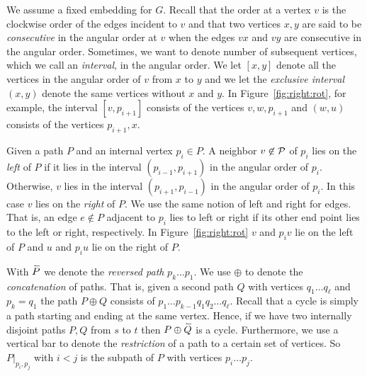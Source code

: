     We assume a fixed embedding for $G$. Recall that the order at a vertex $v$ is the clockwise order of the edges incident to $v$ and that two vertices $x, y$ are said to be \emph{consecutive} in the angular order at $v$ when the edges $vx$ and $vy$ are consecutive in the angular order.
    Sometimes, we want to denote number of subsequent vertices, which we call an \emph{interval}, in the angular order. We let $[x,y]$ denote all the vertices in the angular order of $v$ from $x$ to $y$ and we let the \emph{exclusive interval} $(x,y)$ denote the same vertices without $x$ and $y$. In Figure~\ref{fig:right:rot}, for example, the interval $[v,p_{i+1}]$ consists of the vertices $v,w,p_{i+1}$ and $(w,u)$ consists of the vertices $p_{i+1}, x$.

    Given a path $P$ and an internal vertex $p_i \in P$. A neighbor $v \not \in \mathcal{P}$ of $p_i$ lies on the \emph{left} of $P$ if it lies in the interval $(p_{i-1}, p_{i+1})$ in the angular order of $p_{i}$. Otherwise, $v$ lies in the interval $(p_{i+1}, p_{i-1})$ in the angular order of $p_i$. In this case $v$ lies on the \emph{right} of $P$.
    We use the same notion of left and right for edges. That is, an edge $e\nin P$ adjacent to $p_i$ lies to left or right if its other end point lies to the left or right, respectively. In Figure~\ref{fig:right:rot} $v$ and $p_i v$ lie on the left of $P$ and $u$ and $p_i u$ lie on the right of $P$.

    With $\accentset{\leftharpoonup}{P}$ we denote the \emph{reversed path} $p_k \ldots p_1$. We use $\oplus$ to denote the \emph{concatenation} of paths.
    That is, given a second path $Q$ with vertices $q_1 \ldots q_\ell$ and $p_k = q_1$ the path $P \oplus Q$ consists of $p_1 \ldots p_{k-1} q_1 q_2 \ldots q_\ell$.
    Recall that a cycle is simply a path starting and ending at the same vertex.
    Hence, if we have two internally disjoint paths $P, Q$ from $s$ to $t$ then $P \oplus \accentset{\leftharpoonup}{Q}$ is a cycle.
    Furthermore, we use a vertical bar to denote the \emph{restriction} of a path to a certain set of vertices. So $P|_{p_i, p_j}$ with $i<j$ is the subpath of $P$ with vertices $p_i \ldots p_j$.

